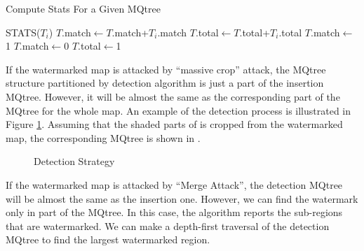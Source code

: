 \begin{algorithm}[th]
\caption{Compute Stats For a Given MQtree}
\label{algo:mark}
\begin{algorithmic}[1]
\Statex
{}
\State STATS(${T}_{i}$)
\State $T$.match$\leftarrow$$T$.match+${T}_{i}$.match
\State $T$.total$\leftarrow$$T$.total+${T}_{i}$.total 
\EndFor
\Else{}
\State $T$.match$\leftarrow$1
\Else{}
\State $T$.match$\leftarrow$0
\EndIf
\State $T$.total$\leftarrow$1
\EndIf
\EndProcedure
\end{algorithmic}
\end{algorithm}


If the watermarked map is attacked by ``massive crop'' attack, 
the MQtree structure partitioned by detection algorithm is
just a part of the insertion MQtree. 
However, it will be almost the same as the corresponding part of the MQtree 
for the whole map. 
An example of the detection process is illustrated in Figure \ref{fig:detect}. 
Assuming that the shaded parts of  is 
cropped from the watermarked map, 
the corresponding MQtree is shown in .


\begin{figure}[h]
\centering
{}
\caption{Detection Strategy}
\label{fig:detect}
\end{figure} 

If the watermarked map is attacked by ``Merge Attack'', 
the detection MQtree will be almost the same as the insertion one. 
However, we can find the watermark only in part of the MQtree. 
In this case, the algorithm reports the sub-regions that are watermarked.
We can make a depth-first traversal of the detection MQtree to 
find the largest watermarked region. %

